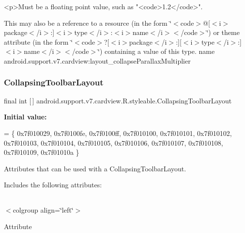 \begin{DoxyVerb}      <p>Must be a floating point value, such as "<code>1.2</code>".
\end{DoxyVerb}
 

This may also be a reference to a resource (in the form \char`\"{}$<$code$>$@\mbox{[}$<$i$>$package$<$/i$>$\+:\mbox{]}$<$i$>$type$<$/i$>$\+:$<$i$>$name$<$/i$>$$<$/code$>$\char`\"{}) or theme attribute (in the form \char`\"{}$<$code$>$?\mbox{[}$<$i$>$package$<$/i$>$\+:\mbox{]}\mbox{[}$<$i$>$type$<$/i$>$\+:\mbox{]}$<$i$>$name$<$/i$>$$<$/code$>$\char`\"{}) containing a value of this type.  name android.\+support.\+v7.\+cardview\+:layout\+\_\+collapse\+Parallax\+Multiplier \mbox{\label{classandroid_1_1support_1_1v7_1_1cardview_1_1R_1_1styleable_a3b4c5393d0c99cb4e5a7a3911fc606b4}} 
\subsubsection{\texorpdfstring{Collapsing\+Toolbar\+Layout}{CollapsingToolbarLayout}}
{\footnotesize\ttfamily final int \mbox{[}$\,$\mbox{]} android.\+support.\+v7.\+cardview.\+R.\+styleable.\+Collapsing\+Toolbar\+Layout\hspace{0.3cm}{\ttfamily [static]}}

{\bfseries Initial value\+:}
\begin{DoxyCode}
= \{
            0x7f010029, 0x7f0100fe, 0x7f0100ff, 0x7f010100,
            0x7f010101, 0x7f010102, 0x7f010103, 0x7f010104,
            0x7f010105, 0x7f010106, 0x7f010107, 0x7f010108,
            0x7f010109, 0x7f01010a
        \}
\end{DoxyCode}
Attributes that can be used with a Collapsing\+Toolbar\+Layout. 

Includes the following attributes\+:

\tabulinesep=1mm
\begin{longtabu} spread 0pt [c]{*{0}{|X[-1]}|}
\hline
\end{longtabu}
$<$colgroup align=\char`\"{}left\char`\"{}$>$ 

Attribute

